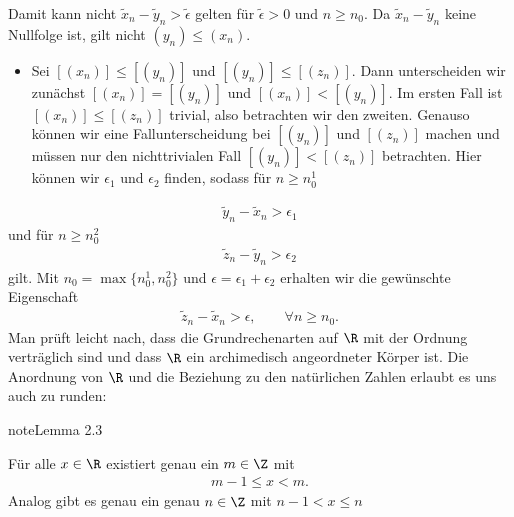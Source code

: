 \documentclass[letterpaper,10pt,english]{jupyterBook}
\begin{document}
Damit kann nicht \(\tilde x_n - \tilde y_n > \tilde \epsilon\) gelten für \(\tilde \epsilon >0\) und \(n \geq n_0\). Da \(\tilde x_n - \tilde y_n\) keine Nullfolge ist, gilt nicht \((y_n) \leq (x_n)\).
\begin{itemize}
\item {} 
 Sei \([(x_n)] \leq [(y_n)]\) und \([(y_n)] \leq [(z_n)]\). Dann unterscheiden wir zunächst \([(x_n)]=[(y_n)]\) und \([(x_n)]< [(y_n)]\). Im ersten Fall ist \([(x_n)] \leq [(z_n)]\) trivial, also betrachten wir den zweiten. Genauso können wir eine Fallunterscheidung bei \([(y_n)]\) und \([(z_n)]\) machen und müssen nur den nichttrivialen Fall \([(y_n)]<[(z_n)]\) betrachten. Hier können wir \(\epsilon_1\) und \(\epsilon_2\) finden, sodass für \(n\geq n_0^1\)

\end{itemize}
\begin{equation*}
\begin{split}\tilde y_n - \tilde x_n > \epsilon_1\end{split}
\end{equation*}
und für \(n\geq n_0^2\)
\begin{equation*}
\begin{split}\tilde z_n - \tilde y_n > \epsilon_2\end{split}
\end{equation*}
gilt. Mit \(n_0=\max\{n_0^1,n_0^2\}\) und \(\epsilon = \epsilon_1 + \epsilon_2\) erhalten wir die gewünschte Eigenschaft
\begin{equation*}
\begin{split}\tilde z_n - \tilde x_n > \epsilon, \qquad \forall n \geq n_0.\end{split}
\end{equation*}
Man prüft leicht nach, dass die Grundrechenarten auf \(\R\) mit der Ordnung verträglich sind und dass \(\R\) ein archimedisch angeordneter Körper ist. Die Anordnung von \(\R\) und die Beziehung zu den natürlichen Zahlen erlaubt es uns auch zu runden:
\label{grundlagen/zahlensysteme:lemma-19}
\begin{sphinxadmonition}{note}{Lemma 2.3}



Für alle \(x \in \R\) existiert genau ein \(m\in \Z\) mit
\begin{equation*}
\begin{split} m-1 \leq x < m .\end{split}
\end{equation*}
Analog gibt es genau ein genau \(n \in \Z\) mit \(n-1 < x \leq n\)
\end{sphinxadmonition}
\end{document}
